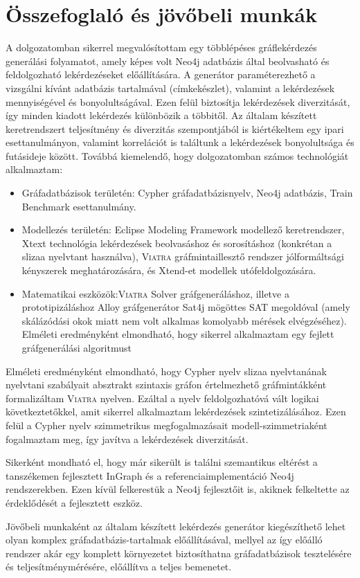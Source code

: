 \chapter{Összefoglaló és jövőbeli munkák}
\label{chp:7}

A dolgozatomban sikerrel megvalósítottam egy többlépéses gráflekérdezés generálási folyamatot, amely képes volt Neo4j adatbázis által beolvasható és feldolgozható lekérdezéseket előállítására. A generátor paraméterezhető a vizsgálni kívánt adatbázis tartalmával (címkekészlet), valamint a lekérdezések mennyiségével és bonyolultságával.
Ezen felül biztosítja lekérdezések diverzitását, így minden kiadott lekérdezés különbözik a többitől.
Az általam készített keretrendszert teljesítmény és diverzitás szempontjából is kiértékeltem egy ipari esettanulmányon, valamint korrelációt is találtunk a lekérdezések bonyolultsága és futásideje között.
Továbbá kiemelendő, hogy dolgozatomban számos technológiát alkalmaztam:
 \begin{itemize}
 	\item Gráfadatbázisok területén: Cypher gráfadatbázisnyelv, Neo4j adatbázis, Train Benchmark esettanulmány.
 	\item Modellezés területén: Eclipse Modeling Framework modellező keretrendszer, Xtext technológia lekérdezések beolvasáshoz és sorosításhoz (konkrétan a slizaa nyelvtant használva), \textsc{Viatra} gráfmintaillesztő rendszer jólformáltsági kényszerek meghatározására, és Xtend-et modellek utófeldolgozására.
 	\item Matematikai eszközök:\textsc{Viatra} Solver gráfgeneráláshoz, illetve a prototipizáláshoz Alloy gráfgenerátor Sat4j mögöttes SAT megoldóval (amely skálázódási okok miatt nem volt alkalmas komolyabb mérések elvégzéséhez).
 	Elméleti eredményként elmondható, hogy sikerrel alkalmaztam egy fejlett gráfgenerálási algoritmust
 \end{itemize}

Elméleti eredményként elmondható, hogy Cypher nyelv slizaa nyelvtanának nyelvtani szabályait absztrakt szintaxis gráfon értelmezhető gráfmintákként formalizáltam \textsc{Viatra} nyelven. Ezáltal a nyelv feldolgozhatóvá vált logikai következtetőkkel, amit sikerrel alkalmaztam lekérdezések szintetizálásához. Ezen felül a Cypher nyelv szimmetrikus megfogalmazásait modell-szimmetriaként fogalmaztam meg, így javítva a lekérdezések diverzitását.

Sikerként mondható el, hogy már sikerült is találni szemantikus eltérést a tanszékemen fejlesztett InGraph 
\cite{MartonSB17} és a referenciaimplementáció Neo4j rendszerekben. Ezen kívül felkerestük a Neo4j fejlesztőit is, akiknek felkeltette az érdeklődését a fejlesztett eszköz.

Jövőbeli munkaként az általam készített lekérdezés generátor kiegészíthető lehet olyan komplex gráfadatbázis-tartalmak előállításával, mellyel az így előálló rendszer akár egy komplett környezetet biztosíthatna gráfadatbázisok tesztelésére és teljesítménymérésére, előállítva a teljes bemenetet.
